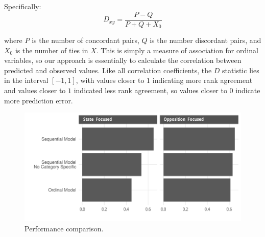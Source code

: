 Specifically:
$$D_{xy} = \frac{P - Q}{P + Q + X_0}$$

\noindent where $P$ is the number of concordant pairs, $Q$ is the number discordant pairs, and $X_0$ is the number of ties in $X$. This is simply a measure of association for ordinal variables, so our approach is essentially to calculate the correlation between predicted and observed values. Like all correlation coefficients, the $D$ statistic lies in the interval $[-1, 1]$, with values closer to $1$ indicating more rank agreement and values closer to $1$ indicated less rank agreement, so values closer to 0 indicate more prediction error.

\begin{figure}
    \centering
    \includegraphics[width=1\textwidth]{somerViz.pdf}
    \caption{Performance comparison.}
    \label{fig:somersD}
\end{figure}
